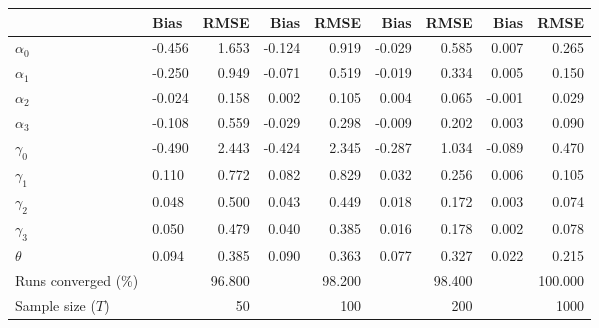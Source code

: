 
\begin{tabular}[t]{llrrrrrrr}
\toprule
  & Bias & RMSE & Bias & RMSE & Bias & RMSE & Bias & RMSE\\
\midrule
$\alpha_{0}$ & -0.456 & 1.653 & -0.124 & 0.919 & -0.029 & 0.585 & 0.007 & 0.265\\
$\alpha_{1}$ & -0.250 & 0.949 & -0.071 & 0.519 & -0.019 & 0.334 & 0.005 & 0.150\\
$\alpha_{2}$ & -0.024 & 0.158 & 0.002 & 0.105 & 0.004 & 0.065 & -0.001 & 0.029\\
$\alpha_{3}$ & -0.108 & 0.559 & -0.029 & 0.298 & -0.009 & 0.202 & 0.003 & 0.090\\
$\gamma_{0}$ & -0.490 & 2.443 & -0.424 & 2.345 & -0.287 & 1.034 & -0.089 & 0.470\\
$\gamma_{1}$ & 0.110 & 0.772 & 0.082 & 0.829 & 0.032 & 0.256 & 0.006 & 0.105\\
$\gamma_{2}$ & 0.048 & 0.500 & 0.043 & 0.449 & 0.018 & 0.172 & 0.003 & 0.074\\
$\gamma_{3}$ & 0.050 & 0.479 & 0.040 & 0.385 & 0.016 & 0.178 & 0.002 & 0.078\\
$\theta$ & 0.094 & 0.385 & 0.090 & 0.363 & 0.077 & 0.327 & 0.022 & 0.215\\
Runs converged (\%) &  & 96.800 &  & 98.200 &  & 98.400 &  & 100.000\\
Sample size ($T$) &  & 50 &  & 100 &  & 200 &  & 1000\\
\bottomrule
\end{tabular}
